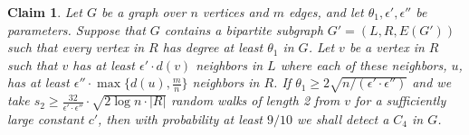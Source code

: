 \documentclass{article}
\newcommand{\eps}{\epsilon}
\newtheorem{claim}[lemma]{Claim}
\newcommand{\commentt}[1]{ {}}
\newcommand{\talya}[1]{{} }
\begin{document}
\begin{claim}\label{clm:C4-ub2}
Let $G$ be a graph over $n$ vertices and $m$ edges, and let $\theta_1, \eps', \eps''$ be parameters.
Suppose that $G$ contains a bipartite subgraph $G' = (L,R,E(G'))$ such that every vertex in $R$ has degree at least $\theta_1$ in $G$. 
Let $v$ be a vertex in $R$ such that $v$ has at least $\eps' \cdot d(v)$ neighbors in $L$ where each  of these neighbors, $u$, has at least $\eps'' \cdot \max\{d(u),\frac{m}{n}\}$ neighbors in $R$. %
If $\theta_1\geq 2\sqrt{n/(\eps'\cdot \eps'')}$ and we take $s_2 \geq \frac{32}{\eps'\cdot \eps''}\cdot \sqrt{2\log n\cdot |R|}$ random walks of length 2 from $v$ for a sufficiently large constant $c'$, then with probability at least $9/10$ we shall detect a $C_4$ in $G$.
\end{claim}
\end{document}
